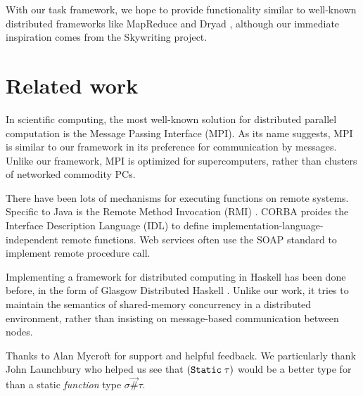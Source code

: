 \documentclass[preprint]{sigplanconf}
\begin{document}
With our task framework, we hope to provide functionality similar to well-known distributed frameworks like MapReduce \cite{MapReduce2008} and Dryad \cite{Dryad2007}, although our immediate inspiration comes from the Skywriting \cite{Murray2010}\cite{Murray2011} project.


\section{Related work}

In scientific computing, the most well-known solution for distributed parallel computation is the Message Passing Interface (MPI). As its name suggests, MPI is similar to our framework in its preference for communication by messages. Unlike our framework, MPI is optimized for supercomputers, rather than clusters of networked commodity PCs. 

There have been lots of mechanisms for executing functions on remote systems. Specific to Java is the Remote Method Invocation (RMI) \cite{javarmi}. CORBA proides the Interface Description Language (IDL) \cite{corbaidl} to define implementation-language-independent remote functions. Web services often use the SOAP standard to implement remote procedure call.

Implementing a framework for distributed computing in Haskell has been done before, in the form of Glasgow Distributed Haskell \cite{gdh2001}. Unlike our work, it tries to maintain the semantics of shared-memory concurrency in a distributed environment, rather than insisting on message-based communication between nodes.



\acks
Thanks to Alan Mycroft for support and helpful feedback. 
We particularly thank John Launchbury who helped us see that $(\text{\tt Static}\;\tau)$
would be a better type for than a static \emph{function} type 
$\sigma \stackrel{\to}{\#} \tau$.





%
%
%
\end{document}
